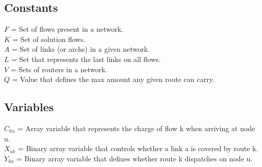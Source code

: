 \subsection{Constants}
$F$ = Set of flows present in a network. \\
$K$ = Set of solution flows. \\
$A$ = Set of links (or archs) in a given network. \\
$L$ = Set that represents the last links on all flows. \\
$V$ = Sets of routers in a network. \\
$Q$ = Value that defines the max amount any given route can carry.

\subsection{Variables}
$C_{ku}$ =  Array variable that represents the charge of flow k when arriving at node u. \\
$X_{ak}$ =  Binary array variable that controls whether a link a is covered by route k. \\ 
$Y_{ku}$ =  Binary array variable that defines whether route k dispatches on node u. \\

